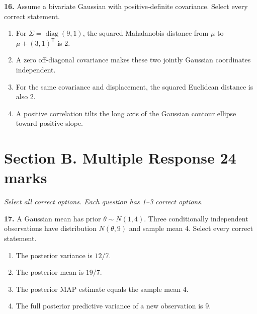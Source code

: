 \documentclass[11pt,a4paper]{article}
\begin{document}
\par\noindent\begin{minipage}{\linewidth}
\textbf{16.} Assume a bivariate Gaussian with positive-definite covariance. Select every correct statement.
\begin{enumerate}[label=(\Alph*),leftmargin=8mm,itemsep=2pt,topsep=2pt]
\item For \(\Sigma=\operatorname{diag}(9,1)\), the squared Mahalanobis distance from \(\mu\) to \(\mu+(3,1)^\mathsf T\) is 2.
\item A zero off-diagonal covariance makes these two jointly Gaussian coordinates independent.
\item For the same covariance and displacement, the squared Euclidean distance is also 2.
\item A positive correlation tilts the long axis of the Gaussian contour ellipse toward positive slope.
\end{enumerate}

\end{minipage}\par\vspace{3mm}
\newpage\section*{Section B. Multiple Response \hfill 24 marks}
\textit{Select all correct options. Each question has 1--3 correct options.}\par
\par\noindent\begin{minipage}{\linewidth}
\textbf{17.} A Gaussian mean has prior \(\theta\sim N(1,4)\). Three conditionally independent observations have distribution \(N(\theta,9)\) and sample mean 4. Select every correct statement.
\begin{enumerate}[label=(\Alph*),leftmargin=8mm,itemsep=2pt,topsep=2pt]
\item The posterior variance is \(12/7\).
\item The posterior mean is \(19/7\).
\item The posterior MAP estimate equals the sample mean 4.
\item The full posterior predictive variance of a new observation is 9.
\end{enumerate}

\end{minipage}\par\vspace{3mm}
\end{document}
